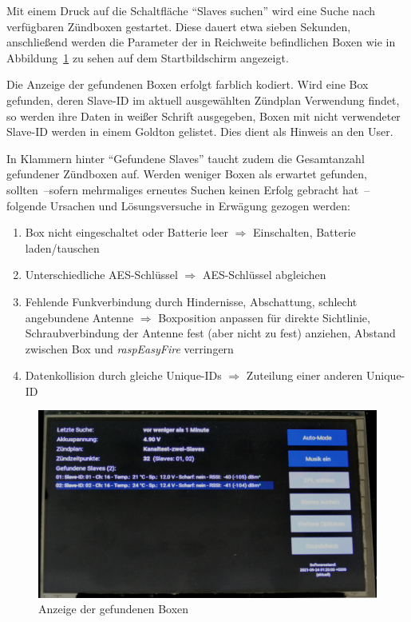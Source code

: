 \documentclass[paper=a4, parskip, numbers=noenddot, toc=listof, headsepline]{scrbook}
\newcommand{\REF}{\emph{raspEasyFire}}
\begin{document}
				Mit einem Druck auf die Schaltfläche \enquote{Slaves suchen} wird eine Suche nach verfügbaren Zündboxen gestartet. Diese dauert etwa sieben Sekunden, anschließend werden die Parameter der in Reichweite befindlichen Boxen wie in Abbildung~\ref{fig:REFslavesfound} zu sehen auf dem Startbildschirm angezeigt.
				
				Die Anzeige der gefundenen Boxen erfolgt farblich kodiert. Wird eine Box gefunden, deren Slave-ID im aktuell ausgewählten Zündplan Verwendung findet, so werden ihre Daten in weißer Schrift ausgegeben, Boxen mit nicht verwendeter Slave-ID werden in einem Goldton gelistet. Dies dient als Hinweis an den User.

				In Klammern hinter \enquote{Gefundene Slaves} taucht zudem die Gesamtanzahl gefundener Zündboxen auf. Werden weniger Boxen als erwartet gefunden, sollten~--sofern mehrmaliges erneutes Suchen keinen Erfolg gebracht hat~-- folgende Ursachen und Lösungsversuche in Erwägung gezogen werden:
				\begin{enumerate}
					\item
					      Box nicht eingeschaltet oder Batterie leer $\Rightarrow$ Einschalten, Batterie laden/tauschen
					\item
					      Unterschiedliche AES-Schlüssel $\Rightarrow$ AES-Schlüssel abgleichen
					\item
					      Fehlende Funkverbindung durch Hindernisse, Abschattung, schlecht angebundene Antenne $\Rightarrow$ Boxposition anpassen für direkte Sichtlinie, Schraubverbindung der Antenne fest (aber nicht zu fest) anziehen, Abstand zwischen Box und {\REF} verringern
					\item
					      Datenkollision durch gleiche Unique-IDs $\Rightarrow$ Zuteilung einer anderen Unique-ID
				\end{enumerate}

				\begin{figure}
					\centering\includegraphics[width=150mm]{Bilder/REFslavesfound}
					\caption{Anzeige der gefundenen Boxen}
					\label{fig:REFslavesfound}
				\end{figure}
\end{document}
